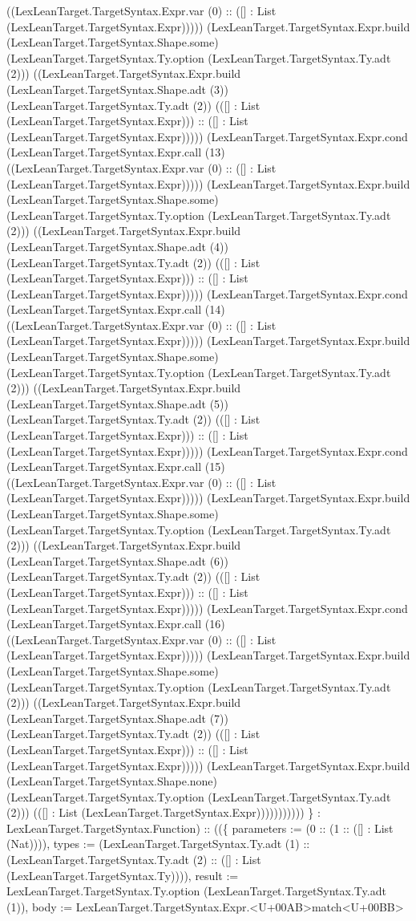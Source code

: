 \documentclass[11pt]{article}
\begin{document}
((LexLeanTarget.TargetSyntax.Expr.var (0) :: ([] : List (LexLeanTarget.TargetSyntax.Expr))))) (LexLeanTarget.TargetSyntax.Expr.build (LexLeanTarget.TargetSyntax.Shape.some) (LexLeanTarget.TargetSyntax.Ty.option (LexLeanTarget.TargetSyntax.Ty.adt (2))) ((LexLeanTarget.TargetSyntax.Expr.build (LexLeanTarget.TargetSyntax.Shape.adt (3)) (LexLeanTarget.TargetSyntax.Ty.adt (2)) (([] : List (LexLeanTarget.TargetSyntax.Expr))) :: ([] : List (LexLeanTarget.TargetSyntax.Expr))))) (LexLeanTarget.TargetSyntax.Expr.cond (LexLeanTarget.TargetSyntax.Expr.call (13) ((LexLeanTarget.TargetSyntax.Expr.var (0) :: ([] : List (LexLeanTarget.TargetSyntax.Expr))))) (LexLeanTarget.TargetSyntax.Expr.build (LexLeanTarget.TargetSyntax.Shape.some) (LexLeanTarget.TargetSyntax.Ty.option (LexLeanTarget.TargetSyntax.Ty.adt (2))) ((LexLeanTarget.TargetSyntax.Expr.build (LexLeanTarget.TargetSyntax.Shape.adt (4)) (LexLeanTarget.TargetSyntax.Ty.adt (2)) (([] : List (LexLeanTarget.TargetSyntax.Expr))) :: ([] : List (LexLeanTarget.TargetSyntax.Expr))))) (LexLeanTarget.TargetSyntax.Expr.cond (LexLeanTarget.TargetSyntax.Expr.call (14) ((LexLeanTarget.TargetSyntax.Expr.var (0) :: ([] : List (LexLeanTarget.TargetSyntax.Expr))))) (LexLeanTarget.TargetSyntax.Expr.build (LexLeanTarget.TargetSyntax.Shape.some) (LexLeanTarget.TargetSyntax.Ty.option (LexLeanTarget.TargetSyntax.Ty.adt (2))) ((LexLeanTarget.TargetSyntax.Expr.build (LexLeanTarget.TargetSyntax.Shape.adt (5)) (LexLeanTarget.TargetSyntax.Ty.adt (2)) (([] : List (LexLeanTarget.TargetSyntax.Expr))) :: ([] : List (LexLeanTarget.TargetSyntax.Expr))))) (LexLeanTarget.TargetSyntax.Expr.cond (LexLeanTarget.TargetSyntax.Expr.call (15) ((LexLeanTarget.TargetSyntax.Expr.var (0) :: ([] : List (LexLeanTarget.TargetSyntax.Expr))))) (LexLeanTarget.TargetSyntax.Expr.build (LexLeanTarget.TargetSyntax.Shape.some) (LexLeanTarget.TargetSyntax.Ty.option (LexLeanTarget.TargetSyntax.Ty.adt (2))) ((LexLeanTarget.TargetSyntax.Expr.build (LexLeanTarget.TargetSyntax.Shape.adt (6)) (LexLeanTarget.TargetSyntax.Ty.adt (2)) (([] : List (LexLeanTarget.TargetSyntax.Expr))) :: ([] : List (LexLeanTarget.TargetSyntax.Expr))))) (LexLeanTarget.TargetSyntax.Expr.cond (LexLeanTarget.TargetSyntax.Expr.call (16) ((LexLeanTarget.TargetSyntax.Expr.var (0) :: ([] : List (LexLeanTarget.TargetSyntax.Expr))))) (LexLeanTarget.TargetSyntax.Expr.build (LexLeanTarget.TargetSyntax.Shape.some) (LexLeanTarget.TargetSyntax.Ty.option (LexLeanTarget.TargetSyntax.Ty.adt (2))) ((LexLeanTarget.TargetSyntax.Expr.build (LexLeanTarget.TargetSyntax.Shape.adt (7)) (LexLeanTarget.TargetSyntax.Ty.adt (2)) (([] : List (LexLeanTarget.TargetSyntax.Expr))) :: ([] : List (LexLeanTarget.TargetSyntax.Expr))))) (LexLeanTarget.TargetSyntax.Expr.build (LexLeanTarget.TargetSyntax.Shape.none) (LexLeanTarget.TargetSyntax.Ty.option (LexLeanTarget.TargetSyntax.Ty.adt (2))) (([] : List (LexLeanTarget.TargetSyntax.Expr))))))))))) \} : LexLeanTarget.TargetSyntax.Function) :: ((\{ parameters := (0 :: (1 :: ([] : List (Nat)))), types := (LexLeanTarget.TargetSyntax.Ty.adt (1) :: (LexLeanTarget.TargetSyntax.Ty.adt (2) :: ([] : List (LexLeanTarget.TargetSyntax.Ty)))), result := LexLeanTarget.TargetSyntax.Ty.option (LexLeanTarget.TargetSyntax.Ty.adt (1)), body := LexLeanTarget.TargetSyntax.Expr.<U+00AB>match<U+00BB> 
\end{document}
